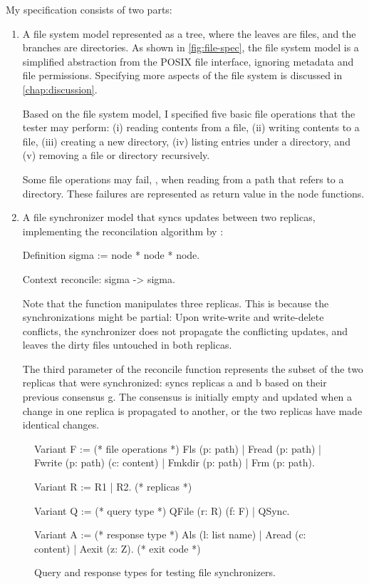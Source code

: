My specification consists of two parts:
\begin{enumerate}
  \item A file system model represented as a tree, where the leaves are files,
    and the branches are directories.  As shown in \autoref{fig:file-spec}, the
    file system model is a simplified abstraction from the POSIX file interface,
    ignoring metadata and file permissions.  Specifying more aspects of the file
    system is discussed in \autoref{chap:discussion}.

    Based on the file system model, I specified five basic file operations that
    the tester may perform: (i) reading contents from a file, (ii) writing
    contents to a file, (iii) creating a new directory, (iv) listing entries
    under a directory, and (v) removing a file or directory recursively.

    Some file operations may fail, \eg, when reading from a path that
    refers to a directory.  These failures are represented as return value
     in the node functions.
  \item A file synchronizer model that syncs updates between two replicas,
    implementing the reconcilation algorithm by \citet{what-sync}:
\begin{coq}
  Definition sigma := node * node * node.
      
  Context reconcile: sigma -> sigma.
\end{coq}
Note that the  function manipulates three replicas.  This is
because the synchronizations might be partial: Upon write-write and write-delete
conflicts, the synchronizer does not propagate the conflicting updates, and
leaves the dirty files untouched in both replicas.

The third parameter of the reconcile function represents the subset of the two
replicas that were synchronized:  syncs replicas \ilc a
and \ilc b based on their previous consensus \ilc g.  The consensus is initially
empty and updated when a change in one replica is propagated to another, or the
two replicas have made identical changes.
\end{enumerate}

\begin{figure}
\begin{coq}
    Variant F :=        (* file operations *)
    Fls    (p: path)
  | Fread  (p: path)
  | Fwrite (p: path) (c: content)
  | Fmkdir (p: path)
  | Frm    (p: path).

  Variant R := R1 | R2. (* replicas      *)

  Variant Q :=          (* query type    *)
    QFile (r: R) (f: F)
  | QSync.

  Variant A :=          (* response type *)
    Als   (l: list name)
  | Aread (c: content)
  | Aexit (z: Z).       (* exit code     *)
\end{coq}
\vspace*{1em}
\caption{Query and response types for testing file synchronizers.}
\label{fig:file-type}
\end{figure}


